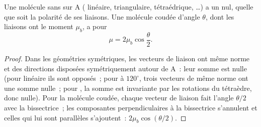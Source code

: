 \begin{proposition}\label{prop:b1:lewis-resonance-vsepr:dipole-sum}
Une molécule  sans  sur A ( linéaire,
 triangulaire,  tétraédrique, \dots) a un  nul, quelle que soit la polarité de ses liaisons. Une molécule
 coudée d'angle $\theta$, dont les liaisons ont le moment
$\mu_b$, a pour 
\[
  \mu = 2\mu_b \cos\frac{\theta}{2} .
\]
\end{proposition}

\begin{proof}
Dans les géométries symétriques, les vecteurs de liaison ont même norme
et des directions disposées symétriquement autour de A~: leur somme est
nulle (pour  linéaire ils sont opposés~; pour  à
$120^\circ$, trois vecteurs de même norme ont une somme nulle~; pour
, la somme est invariante par les rotations du tétraèdre, donc
nulle). Pour la molécule coudée, chaque vecteur de liaison fait l'angle
$\theta/2$ avec la bissectrice~; les composantes perpendiculaires à la
bissectrice s'annulent et celles qui lui sont parallèles s'ajoutent~:
$2\mu_b\cos(\theta/2)$.
\end{proof}

